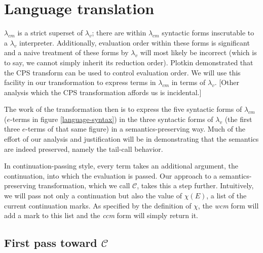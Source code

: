 \documentclass[ms,electronic,twosidetoc,letterpaper,chaptercenter,parttop]{byumsphd}
\begin{document}
\section{Language translation}

$\lambda_{cm}$ is a strict superset of $\lambda_{v}$; there are within $\lambda_{cm}$
syntactic forms inscrutable to a $\lambda_{v}$ interpreter. Additionally, evaluation order
within these forms is significant and a naive treatment of these forms by $\lambda_{v}$
will most likely be incorrect (which is to say, we cannot simply inherit its reduction
order). Plotkin \cite{plotkin1975call} demonstrated that the CPS transform can be used to
control evaluation order. We will use this facility in our transformation to express terms
in $\lambda_{cm}$ in terms of $\lambda_{v}$. [Other analysis which the CPS transformation
affords us \cite{appel2007compiling} is incidental.]

The work of the transformation then is to express the five syntactic forms of
$\lambda_{cm}$ ($e$-terms in figure \ref{language-syntax}) in the three syntactic forms of
$\lambda_{v}$ (the first three $e$-terms of that same figure) in a semantics-preserving
way. Much of the effort of our analysis and justification will be in demonstrating that
the semantics are indeed preserved, namely the tail-call behavior.

In continuation-passing style, every term takes an additional argument, the continuation,
into which the evaluation is passed. Our approach to a semantics-preserving
transformation, which we call $\mathcal{C}$, takes this a step further. Intuitively, we
will pass not only a continuation but also the value of $\chi(E)$, a list of the current 
continuation marks. As specified by the definition of $\chi$, the \emph{wcm} form will 
add a mark to this list and the \emph{ccm} form will simply return it.

\subsection{First pass toward $\mathcal{C}$}
\end{document}
